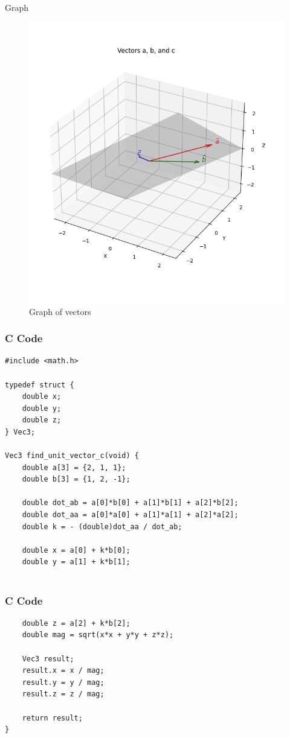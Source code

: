 \documentclass{beamer}
\begin{document}
\begin{frame}{Graph}
\begin{figure}
\centering
\includegraphics[height=0.8\textheight, keepaspectratio]{figs/q5.png}
\caption{Graph of vectors}
\end{figure}
\end{frame}

\begin{frame}[fragile]
    \frametitle{C Code}
\begin{lstlisting}
#include <math.h>

typedef struct {
    double x;
    double y;
    double z;
} Vec3;

Vec3 find_unit_vector_c(void) {
    double a[3] = {2, 1, 1};
    double b[3] = {1, 2, -1};

    double dot_ab = a[0]*b[0] + a[1]*b[1] + a[2]*b[2];
    double dot_aa = a[0]*a[0] + a[1]*a[1] + a[2]*a[2];
    double k = - (double)dot_aa / dot_ab;

    double x = a[0] + k*b[0];
    double y = a[1] + k*b[1];
    

\end{lstlisting}
\end{frame}

\begin{frame}[fragile]
    \frametitle{C Code}
\begin{lstlisting}
    double z = a[2] + k*b[2];
    double mag = sqrt(x*x + y*y + z*z);

    Vec3 result;
    result.x = x / mag;
    result.y = y / mag;
    result.z = z / mag;

    return result;
}
\end{lstlisting}
\end{frame}
\end{document}
